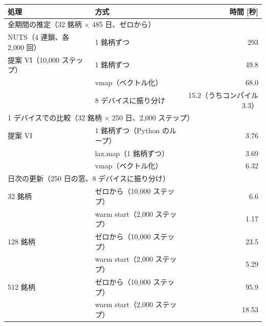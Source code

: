 \begin{tabular}{llr}
\toprule
処理 & 方式 & 時間 [秒] \\
\midrule
\multicolumn{3}{l}{全期間の推定（32 銘柄 × 485 日、ゼロから）} \\
NUTS（4 連鎖、各 2,000 回） & 1 銘柄ずつ & 293 \\
提案 VI（10,000 ステップ） & 1 銘柄ずつ & 49.8 \\
 & vmap（ベクトル化） & 68.0 \\
 & 8 デバイスに振り分け & 15.2（うちコンパイル 3.3） \\
\midrule
\multicolumn{3}{l}{1 デバイスでの比較（32 銘柄 × 250 日、2,000 ステップ）} \\
提案 VI & 1 銘柄ずつ（Python のループ） & 3.76 \\
 & lax.map（1 銘柄ずつ） & 3.69 \\
 & vmap（ベクトル化） & 6.32 \\
\midrule
\multicolumn{3}{l}{日次の更新（250 日の窓、8 デバイスに振り分け）} \\
32 銘柄 & ゼロから（10,000 ステップ） & 6.6 \\
 & warm start（2,000 ステップ） & 1.17 \\
128 銘柄 & ゼロから（10,000 ステップ） & 23.5 \\
 & warm start（2,000 ステップ） & 5.29 \\
512 銘柄 & ゼロから（10,000 ステップ） & 95.9 \\
 & warm start（2,000 ステップ） & 18.53 \\
\bottomrule
\end{tabular}
